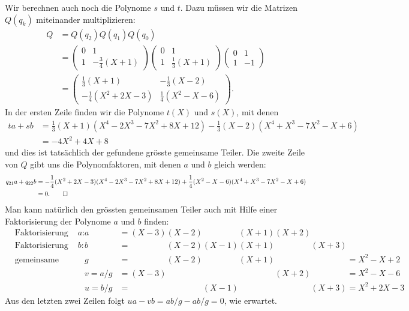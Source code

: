 \begin{beispiel}
Wir berechnen auch noch die Polynome $s$ und $t$.
Dazu müssen wir die Matrizen $Q(q_k)$ miteinander multiplizieren:
\begin{align*}
Q
&=Q(q_2) Q(q_1) Q(q_0)
\\
&=
\begin{pmatrix} 0 & 1 \\ 1 & -\frac34(X+1) \end{pmatrix}
\begin{pmatrix} 0 & 1 \\ 1 & \frac13(X+1) \end{pmatrix}
\begin{pmatrix} 0 & 1 \\ 1 & -1 \end{pmatrix}
\\
&=
\begin{pmatrix}
\frac13(X+1)&-\frac13(X-2)\\
-\frac14(X^2+2X-3)&\frac14(X^2-X-6)
\end{pmatrix}.
\end{align*}
In der ersten Zeile finden wir die Polynome $t(X)$ und $s(X)$, mit denen
\begin{align*}
ta+sb
&=
\frac13(X+1)
(X^4-2X^3-7X^2+8X+12)
-\frac13(X-2)
(X^4+X^3-7X^2-X+6)
\\
&=
-4X^2+4X+8
\end{align*}
und dies ist tatsächlich der gefundene grösste gemeinsame Teiler.
Die zweite Zeile von $Q$ gibt uns die Polynomfaktoren, mit denen
$a$ und $b$ gleich werden:
\begin{align*}
q_{21}a+q_{22}b
&=
-\frac14(X^2+2X-3)
(X^4-2X^3-7X^2+8X+12)
+\frac14(X^2-X-6)
(X^4+X^3-7X^2-X+6)
\\
&=0.
\qedhere
\end{align*}
Man kann natürlich den grössten gemeinsamen Teiler auch mit Hilfe einer
Faktorisierung der Polynome $a$ und $b$ finden:
\begin{align*}
&\text{Faktorisierung von $a$:}&
a  &=         (X-3) (X-2)\phantom{(X-1)}(X+1)         (X+2) \phantom{(X+3)}\\
&\text{Faktorisierung von $b$:}&
b  &=\phantom{(X-3)}(X-2)         (X-1) (X+1)\phantom{(X+2)}         (X+3) \\
&\text{gemeinsame Faktoren:}&
g  &=\phantom{(X-3)}(X-2)\phantom{(X-1)}(X+1)\phantom{(X+2)}\phantom{(X+3)}
    = X^2 -X + 2\\
&&
v=a/g&=         (X-3)\phantom{(X-2)(X-1)(X+1)} (X+2) \phantom{(X+3)}
    = X^2-X-6 \\
&&
u=b/g&=\phantom{(X-3)(X-2)} (X-1)\phantom{(X+1)(X+2)}(X+3)
    = X^2+2X-3
\end{align*}
Aus den letzten zwei Zeilen folgt
$ua-vb = ab/g - ab/g = 0$, wie erwartet.
\end{beispiel}


